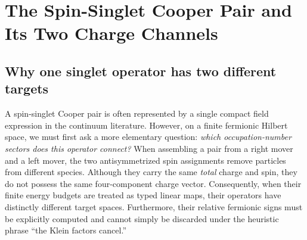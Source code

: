 \section{The Spin-Singlet Cooper Pair and Its Two Charge Channels}
\label{sec:ch21-singlet-pair}

\subsection*{Why one singlet operator has two different targets}

A spin-singlet Cooper pair is often represented by a single compact field expression in the continuum literature. However, on a finite fermionic Hilbert space, we must first ask a more elementary question: \emph{which occupation-number sectors does this operator connect?} When assembling a pair from a right mover and a left mover, the two antisymmetrized spin assignments remove particles from different species. Although they carry the same \emph{total} charge and spin, they do not possess the same four-component charge vector. Consequently, when their finite energy budgets are treated as typed linear maps, their operators have distinctly different target spaces. Furthermore, their relative fermionic signs must be explicitly computed and cannot simply be discarded under the heuristic phrase ``the Klein factors cancel.''

